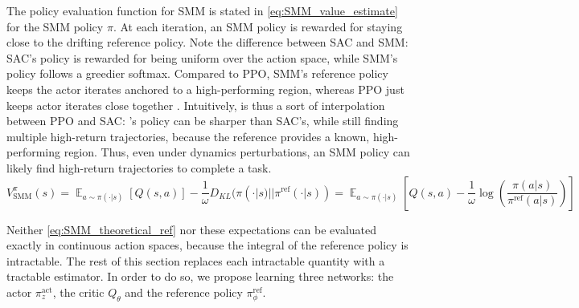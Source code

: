 \documentclass{article} %
\DeclareMathOperator*{\E}{\mathbb{E}}
\newcommand\expectwrt[2]{\E_{#2}\left[ #1 \right]}
\begin{document}
    The policy evaluation function for SMM is stated in \autoref{eq:SMM_value_estimate} for the SMM policy $\pi$. At each iteration, an SMM policy is rewarded for staying close to the drifting reference policy. Note the difference between SAC and SMM: SAC's policy is rewarded for being uniform over the action space, while SMM's policy follows a greedier softmax.
    Compared to PPO, SMM's reference policy keeps the actor iterates anchored to a high-performing region, whereas PPO just keeps actor iterates close together \citep{schulman2017proximal_PPO}.
    Intuitively, \ourMethod is thus a sort of interpolation between PPO and SAC: \ourMethod's policy can be sharper than SAC's, while still finding multiple high-return trajectories, because the reference provides a known, high-performing region.
    Thus, even under dynamics perturbations, an SMM policy can likely find high-return trajectories to complete a task.
    {\small
    \begin{equation}
    \label{eq:SMM_value_estimate}
            V^{\pi}_\text{SMM}(s) = \expectwrt{Q(s, a)}{a \sim \pi(\cdot|s)} - \frac{1}{\omega} D_{KL}(\pi(\cdot|s) || \pi^\text{ref}(\cdot|s)) = \expectwrt{Q(s, a) - \frac{1}{\omega} \log \left( \frac{\pi(a|s)}{\pi^\text{ref}(a|s)} \right)}{a \sim \pi(\cdot|s)}
    \end{equation}
    }
    
    Neither \autoref{eq:SMM_theoretical_ref} nor these expectations can be evaluated exactly in continuous action spaces, because the integral of the reference policy is intractable. The rest of this section replaces each intractable quantity with a tractable estimator. In order to do so, we propose learning three networks: the actor $\pi^\text{act}_z$, the critic $Q_\theta$ and  the reference policy $\pi^\text{ref}_\phi$.
\end{document}
